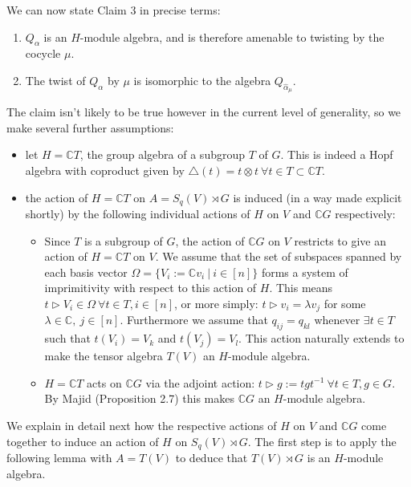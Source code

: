 \documentclass[10pt]{article}
\newcommand{\nt}{\noindent}
\newcommand{\Cc }{\mathbb{C}}
\theoremstyle{definition}
\begin{document}
\nt We can now state Claim 3 in precise terms:
\begin{enumerate}[label=(\alph*)]
  \item $Q_\alpha$ is an $H$-module algebra, and is therefore amenable to twisting by the cocycle $\mu$.
  \item The twist of $Q_\alpha$ by $\mu$ is isomorphic to the algebra $Q_{\hat{\alpha}_\mu}$.
\end{enumerate}

\nt The claim isn't likely to be true however in the current level of generality, so we make several further assumptions:
\begin{itemize}
   \item let $H=\Cc  T$, the group algebra of a subgroup $T$ of $G$. This is indeed a Hopf algebra with coproduct given by $\triangle(t)=t\otimes t\ \forall t\in T\subset \Cc  T$. 
   
   \item the action of $H=\Cc  T$ on $A=S_q(V)\rtimes G$ is induced (in a way made explicit shortly) by the following individual actions of $H$ on $V$ and $\Cc  G$ respectively: 
   \begin{itemize}
      \item Since $T$ is a subgroup of $G$, the action of $\Cc  G$ on $V$ restricts to give an action of $H=\Cc  T$ on $V$. We assume that the set of subspaces spanned by each basis vector $\Omega=\{V_i:=\Cc  v_i\ |\ i\in [n]\}$ forms a system of imprimitivity with respect to this action of $H$. This means $t \rhd V_i \in \Omega\ \forall t\in T, i\in [n]$, or more simply: $t\rhd v_i=\lambda v_j$ for some $\lambda\in \Cc ,\ j\in [n]$. Furthermore we assume that $q_{ij}=q_{kl}$ whenever $\exists t\in T$ such that $t(V_i)=V_k$ and $t(V_j)=V_l$. This action naturally extends to make the tensor algebra $T(V)$ an $H$-module algebra.  

      \item $H=\Cc  T$ acts on $\Cc  G$ via the adjoint action: $t\rhd g:=tgt^{-1}\ \forall t\in T,g\in G$. By Majid \cite{alma9916633704401631} (Proposition 2.7) this makes $\Cc  G$ an $H$-module algebra.
   \end{itemize}
\end{itemize}

\nt We explain in detail next how the respective actions of $H$ on $V$ and $\Cc  G$ come together to induce an action of $H$ on $S_q(V)\rtimes G$. The first step is to apply the following lemma with $A=T(V)$ to deduce that $T(V)\rtimes G$ is an $H$-module algebra.
\end{document}

